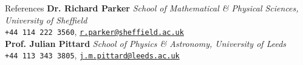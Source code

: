 \documentclass{resume} %
\begin{document}
\begin{rSection}{References}
	{\textbf{Dr. Richard Parker} \hfill \textsl{School of Mathematical \& Physical Sciences, University of Sheffield}} \\
	{\hspace*{0pt}\hfill \texttt{+44 114 222 3560}, \texttt{\href{mailto:r.parker@sheffield.ac.uk}{r.parker@sheffield.ac.uk}}} \\
	{\textbf{Prof. Julian Pittard} \hfill \textsl{School of Physics \& Astronomy, University of Leeds}} \\
	{\hspace*{0pt}\hfill \texttt{+44 113 343 3805}, \texttt{\href{mailto:j.m.pittard@leeds.ac.uk}{j.m.pittard@leeds.ac.uk}}}
\end{rSection}
\end{document}
